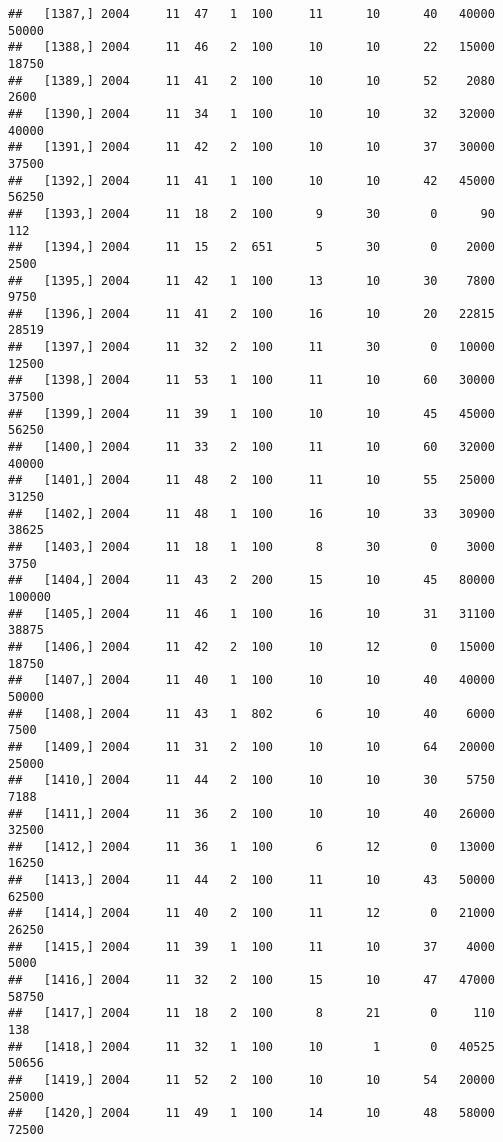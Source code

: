 \documentclass{article}\usepackage[]{graphicx}\usepackage[]{color}
\makeatletter
\newenvironment{kframe}{%
 \def\at@end@of@kframe{}%
 \ifinner\ifhmode%
  \def\at@end@of@kframe{\end{minipage}}%
  \begin{minipage}{\columnwidth}%
 \fi\fi%
 \def\FrameCommand##1{\hskip\@totalleftmargin \hskip-\fboxsep
 \colorbox{shadecolor}{##1}\hskip-\fboxsep
     \hskip-\linewidth \hskip-\@totalleftmargin \hskip\columnwidth}%
 \MakeFramed {\advance\hsize-\width
   \@totalleftmargin\z@ \linewidth\hsize
   \@setminipage}}%
 {\par\unskip\endMakeFramed%
 \at@end@of@kframe}
\newenvironment{knitrout}{}{} %
\makeatother
\begin{document}
\begin{knitrout}
\begin{kframe}
\begin{verbatim}
##   [1387,] 2004     11  47   1  100     11      10      40   40000   50000
##   [1388,] 2004     11  46   2  100     10      10      22   15000   18750
##   [1389,] 2004     11  41   2  100     10      10      52    2080    2600
##   [1390,] 2004     11  34   1  100     10      10      32   32000   40000
##   [1391,] 2004     11  42   2  100     10      10      37   30000   37500
##   [1392,] 2004     11  41   1  100     10      10      42   45000   56250
##   [1393,] 2004     11  18   2  100      9      30       0      90     112
##   [1394,] 2004     11  15   2  651      5      30       0    2000    2500
##   [1395,] 2004     11  42   1  100     13      10      30    7800    9750
##   [1396,] 2004     11  41   2  100     16      10      20   22815   28519
##   [1397,] 2004     11  32   2  100     11      30       0   10000   12500
##   [1398,] 2004     11  53   1  100     11      10      60   30000   37500
##   [1399,] 2004     11  39   1  100     10      10      45   45000   56250
##   [1400,] 2004     11  33   2  100     11      10      60   32000   40000
##   [1401,] 2004     11  48   2  100     11      10      55   25000   31250
##   [1402,] 2004     11  48   1  100     16      10      33   30900   38625
##   [1403,] 2004     11  18   1  100      8      30       0    3000    3750
##   [1404,] 2004     11  43   2  200     15      10      45   80000  100000
##   [1405,] 2004     11  46   1  100     16      10      31   31100   38875
##   [1406,] 2004     11  42   2  100     10      12       0   15000   18750
##   [1407,] 2004     11  40   1  100     10      10      40   40000   50000
##   [1408,] 2004     11  43   1  802      6      10      40    6000    7500
##   [1409,] 2004     11  31   2  100     10      10      64   20000   25000
##   [1410,] 2004     11  44   2  100     10      10      30    5750    7188
##   [1411,] 2004     11  36   2  100     10      10      40   26000   32500
##   [1412,] 2004     11  36   1  100      6      12       0   13000   16250
##   [1413,] 2004     11  44   2  100     11      10      43   50000   62500
##   [1414,] 2004     11  40   2  100     11      12       0   21000   26250
##   [1415,] 2004     11  39   1  100     11      10      37    4000    5000
##   [1416,] 2004     11  32   2  100     15      10      47   47000   58750
##   [1417,] 2004     11  18   2  100      8      21       0     110     138
##   [1418,] 2004     11  32   1  100     10       1       0   40525   50656
##   [1419,] 2004     11  52   2  100     10      10      54   20000   25000
##   [1420,] 2004     11  49   1  100     14      10      48   58000   72500

\end{verbatim}
\end{kframe}
\end{knitrout}
\end{document}
